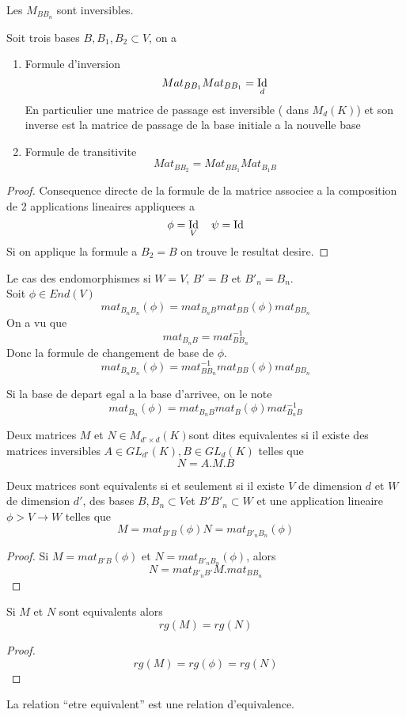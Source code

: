 \documentclass[../main.tex]{subfiles}
\begin{document}
\begin{rmq}
Les $M_{BB_n} $ sont inversibles.
\end{rmq}
\begin{propo}
Soit trois bases $B,B_1,B_2\subset V$, on a
\begin{enumerate}
\item Formule d'inversion
	\[ 
	Mat_{BB_1} Mat_{BB_1} = \operatorname*{Id}_d
	\]
	En particulier une matrice de passage est inversible ( dans $M_d( K) $) et son inverse est la matrice de passage de la base initiale a la nouvelle base

\item Formule de transitivite
	\[ 
	Mat_{BB_2} = Mat_{BB_1} Mat_{B_1B} 
	\]

\end{enumerate}

\end{propo}
\begin{proof}
Consequence directe de la formule de la matrice associee a la composition de 2 applications lineaires appliquees a 
\[ 
\phi = \operatorname*{Id}_V \quad \psi=\operatorname*{Id}
\]
Si on applique la formule a $B_2=B$ on trouve le resultat desire.


\end{proof}
Le cas des endomorphismes si $W= V$, $B'=B$ et $B'_n = B_n$.\\
Soit $\phi \in End( V) $ 
\[ 
	mat_{B_nB_n}( \phi) = mat_{B_nB} mat_{BB} ( \phi) mat_{BB_n} 
\]
On a vu que 
\[ 
mat_{B_nB} = mat_{BB_n}^{-1}
\]
Donc la formule de changement de base de $\phi$.
\[ 
	mat_{B_nB_n} (\phi) = mat_{BB_n}^{-1} mat_{BB} ( \phi) mat_{BB_n} 
\]

Si la base de depart egal a la base d'arrivee, on le note
\[ 
	mat_{B_n} ( \phi) = mat_{B_nB} mat_B( \phi) mat_{B_nB} ^{-1}
\]
\begin{defn}
	Deux matrices $M$ et $N \in M_{d'\times d} ( K) $sont dites equivalentes si il existe des matrices inversibles $A \in GL_{d'} ( K), B\in GL_d( K)  $ telles que
	\[ 
	N= A.M.B
	\]
		
\end{defn}
\begin{propo}
Deux matrices sont equivalents si et seulement si il existe $V$ de dimension $d$ et $W$ de dimension $d' $, des bases $B,B_n\subset V$et $B'B'_n\subset W$ et une application lineaire $\phi> V \to W$ telles que
\[ 
	M= mat_{B'B} ( \phi) N= mat_{B'_nB_n} ( \phi) 
\]

\end{propo}
\begin{proof}
	Si $M= mat_{B'B} ( \phi)$ et $N= mat_{B'_nB_n} ( \phi) $, alors
	\[ 
	N= mat_{B'_nB'} M.mat_{BB_n} 
	\]
	
\end{proof}
\begin{propo}
Si $M$ et $N$ sont equivalents alors
\[ 
	rg( M) = rg( N) 
\]
\end{propo}
\begin{proof}
	\[ 
		rg( M) = rg( \phi) = rg( N) 
	\]
	
\end{proof}
\begin{rmq}
La relation ``etre equivalent'' est une relation d'equivalence.
\end{rmq}
\end{document}
